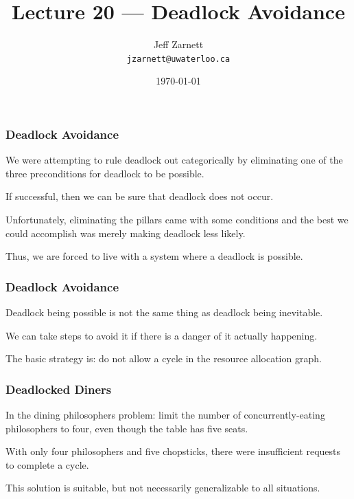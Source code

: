 

\title{Lecture 20 --- Deadlock Avoidance }

\author{Jeff Zarnett \\ \small \texttt{jzarnett@uwaterloo.ca}}
\date{\today}




\begin{frame}
  \titlepage

 \end{frame}

\begin{frame}
\frametitle{Deadlock Avoidance}

We were attempting to rule deadlock out categorically by eliminating one of the three preconditions for deadlock to be possible. 

If successful, then we can be sure that deadlock does not occur. 

Unfortunately, eliminating the pillars came with some conditions and the best we could accomplish was merely making deadlock less likely. 

Thus, we are forced to live with a system where a deadlock is possible. 
\end{frame}


\begin{frame}
\frametitle{Deadlock Avoidance}

Deadlock being possible is not the same thing as deadlock being inevitable.

We can take steps to avoid it if there is a danger of it actually happening. 

The basic strategy is: do not allow a cycle in the resource allocation graph.


\end{frame}

\begin{frame}
\frametitle{Deadlocked Diners}

In the dining philosophers problem: limit the number of concurrently-eating philosophers to four, even though the table has five seats. 

With only four philosophers and five chopsticks, there were insufficient requests to complete a cycle. 

This solution is suitable, but not necessarily generalizable to all situations.

\end{frame}

